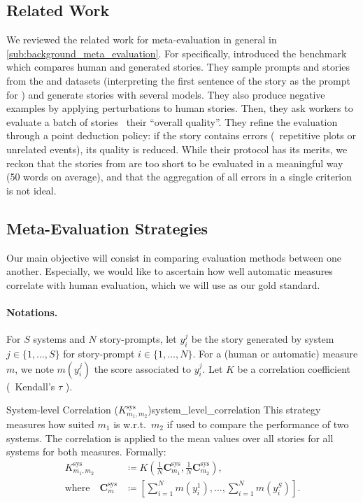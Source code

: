 \subsection{Related Work}
We reviewed the related work for meta-evaluation in general in \autoref{sub:background_meta_evaluation}. For {\asg} specifically, \citet{guan2021openmeva} introduced the {\openmeva} benchmark which compares human and generated stories. They sample prompts and stories from the {\roc} \citep{mostafazadeh2016corpus} and {\wpfan} \citep{fan2018hierarchical} datasets (interpreting the first sentence of the story as the prompt for {\roc}) and generate stories with several models. They also produce negative examples by applying perturbations to human stories. Then, they ask workers to evaluate a batch of stories {\wrt}\ their ``overall quality''. They refine the evaluation through a point deduction policy: if the story contains errors ({\eg}\ repetitive plots or unrelated events), its quality is reduced. While their protocol has its merits, we reckon that the stories from {\roc} are too short to be evaluated in a meaningful way (50 words on average), and that the aggregation of all errors in a single criterion is not ideal.

\subsection{Meta-Evaluation Strategies}
\label{sub:hanna_meta_evaluation_strategies}

Our main objective will consist in comparing evaluation methods between one another. Especially, we would like to ascertain how well automatic measures correlate with human evaluation, which we will use as our gold standard.

\paragraph{Notations.}
For $S$ systems and $N$ story-prompts, let $y_i^j$ be the story generated by system $j \in \{1,\dots,S\}$ for story-prompt $i \in \{1,\dots,N\}$. For a (human or automatic) measure $m$, we note $m(y_i^j)$ the score associated to $y_i^j$. Let $K$ be a correlation coefficient (\eg\ Kendall's $\tau$ \citep{kendall1938new}).

\begin{defi}{System-level Correlation ($K^\textrm{sys}_{m_1,m_2}$)}{system_level_correlation}
This strategy measures how suited $m_1$ is w.r.t.\ $m_2$ if used to compare the performance of two systems. The correlation is applied to the mean values over all stories for all systems for both measures. Formally:
\begin{align}
K^\textrm{sys}_{m_1,m_2} &\coloneqq   K \left(\frac{1}{N} \mathbf{C}^\textrm{sys}_{m_1},\frac{1}{N} \mathbf{C}^\textrm{sys}_{m_2} \right),\\
\text{where} \quad \mathbf{C}^\textrm{sys}_{m} & \coloneqq \left[ \sum\limits_{i=1}^N m\left(y_i^1\right),\dots, \sum\limits_{i=1}^N m\left(y_i^S\right)\right].\nonumber
\end{align}
\end{defi}

